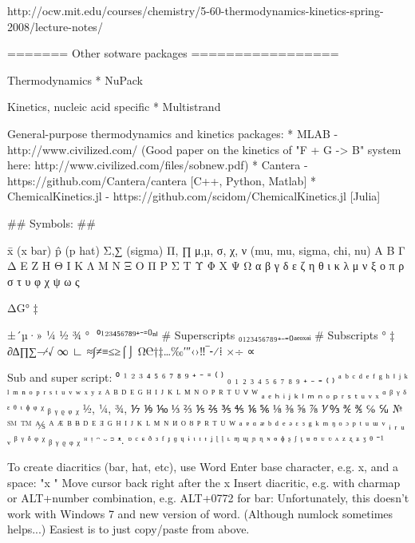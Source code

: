 http://ocw.mit.edu/courses/chemistry/5-60-thermodynamics-kinetics-spring-2008/lecture-notes/




======= Other sotware packages =================


Thermodynamics
* NuPack


Kinetics, nucleic acid specific
* Multistrand

General-purpose thermodynamics and kinetics packages:
* MLAB - http://www.civilized.com/ (Good paper on the kinetics of "F + G -> B" system here: http://www.civilized.com/files/sobnew.pdf)
* Cantera - https://github.com/Cantera/cantera   [C++, Python, Matlab]
* ChemicalKinetics.jl - https://github.com/scidom/ChemicalKinetics.jl  [Julia]



## Symbols: ##

    x̄  (x bar)
    p̂  (p hat)
    Σ,∑  (sigma)
    Π, ∏
    μ,µ, σ, χ, ν (mu, mu, sigma, chi, nu)
    Α Β Γ Δ Ε Ζ Η Θ Ι Κ Λ Μ Ν Ξ Ο Π Ρ Σ Τ Υ Φ Χ Ψ Ω
    α β γ δ ε ζ η θ ι κ λ μ ν ξ ο π ρ σ τ υ φ χ ψ ω ς
 
    ΔG°
    ‡

    ±´µ·» ¼ ½ ¾ ° ­
    ⁰¹²³⁴⁵⁶⁷⁸⁹⁺⁻⁼⁽⁾ⁿⁱ              # Superscripts
    ₀₁₂₃₄₅₆₇₈₉₊₋₌₍₎ₐₑₒₓₔᵢ        # Subscripts
    ° ‡
    ∂∆∏∑−∕∙√ ∞ ∟ ≈∫≠≡≤≥⌠⌡
    Ω℮†‡…‰′″‹›‼‾⁃⁄⁞
    ×÷ ∝

    Sub and super script:
     ⁰ ¹ ² ³ ⁴ ⁵ ⁶ ⁷ ⁸ ⁹ ⁺ ⁻ ⁼ ⁽ ⁾ ₀ ₁ ₂ ₃ ₄ ₅ ₆ ₇ ₈ ₉ ₊ ₋ ₌ ₍ ₎
     ᵃ ᵇ ᶜ ᵈ ᵉ ᶠ ᵍ ʰ ⁱ ʲ ᵏ ˡ ᵐ ⁿ ᵒ ᵖ ʳ ˢ ᵗ ᵘ ᵛ ʷ ˣ ʸ ᶻ
     ᴬ ᴮ ᴰ ᴱ ᴳ ᴴ ᴵ ᴶ ᴷ ᴸ ᴹ ᴺ ᴼ ᴾ ᴿ ᵀ ᵁ ⱽ ᵂ
     ₐ ₑ ₕ ᵢ ⱼ ₖ ₗ ₘ ₙ ₒ ₚ ᵣ ₛ ₜ ᵤ ᵥ ₓ
     ᵅ ᵝ ᵞ ᵟ ᵋ ᶿ ᶥ ᶲ ᵠ ᵡ ᵦ ᵧ ᵨ ᵩ ᵪ
     ½, ¼, ¾, ⅐ ⅑ ⅒ ⅓ ⅔ ⅕ ⅖ ⅗ ⅘ ⅙ ⅚ ⅛ ⅜ ⅝ ⅞ ⅟ ↉
     ℀ ℁ ℅ ℆ № ℠ ™ ⅍
     ᴬ ᴭ ᴮ ᴯ ᴰ ᴱ ᴲ ᴳ ᴴ ᴵ ᴶ ᴷ ᴸ ᴹ ᴺ ᴻ ᴼ ᴽ ᴾ ᴿ ᵀ ᵁ ᵂ ᵃ ᵄ ᵅ ᵆ ᵇ ᵈ ᵉ ᵊ ᵋ ᵌ ᵍ ᵏ ᵐ ᵑ ᵒ ᵓ ᵖ ᵗ ᵘ ᵚ ᵛ ᵢ ᵣ ᵤ ᵥ
     ᵝ ᵞ ᵟ ᵠ ᵡ ᵦ ᵧ ᵨ ᵩ ᵪ ᵸ ᵎ ᵔ ᵕ ᵙ ᵜ.
     ᶛ ᶜ ᶝ ᶞ ᶟ ᶠ ᶡ ᶢ ᶣ ᶤ ᶥ ᶦ ᶧ ᶨ ᶩ ᶪ ᶫ ᶬ ᶭ ᶮ ᶯ ᶰ ᶱ ᶲ ᶳ ᶴ ᶵ ᶶ ᶷ ᶸ ᶹ ᶺ ᶻ ᶼ ᶽ ᶾ ᶿ
    ⁻¹



To create diacritics (bar, hat, etc), use Word
    Enter base character, e.g. x, and a space: "x "
    Move cursor back right after the x
    Insert diacritic, e.g. with charmap or ALT+number combination, e.g. ALT+0772 for bar:
    Unfortunately, this doesn't work with Windows 7 and new version of word.
    (Although numlock sometimes helps...)
    Easiest is to just copy/paste from above.
